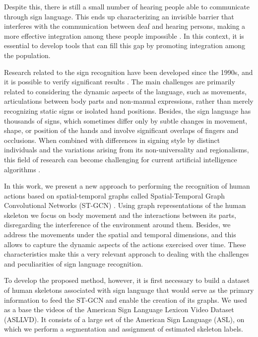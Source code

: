 Despite this, there is still a small number of hearing people able to communicate through sign language. This ends up characterizing an invisible barrier that interferes with the communication between deaf and hearing persons, making a more effective integration among these people impossible \cite{peres-2006}. In this context, it is essential to develop tools that can fill this gap by promoting integration among the population.

Research related to the sign recognition have been developed since the 1990s, and it is possible to verify significant results \cite{lim-2016, recent-advances-dl-2017}. The main challenges are primarily related to considering the dynamic aspects of the language, such as movements, articulations between body parts and non-manual expressions, rather than merely recognizing static signs or isolated hand positions. Besides, the sign language has thousands of signs, which sometimes differ only by subtle changes in movement, shape, or position of the hands and involve significant overlaps of fingers and occlusions. When combined with differences in signing style by distinct individuals and the variations arising from its non-universality and regionalisms, this field of research can become challenging for current artificial intelligence algorithms \cite{konstantinidis-2018}.

In this work, we present a new approach to performing the recognition of human actions based on spatial-temporal graphs called Spatial-Temporal Graph Convolutional Networks (ST-GCN) \cite {st-gcn-2018}. Using graph representations of the human skeleton we focus on body movement and the interactions between its parts, disregarding the interference of the environment around them. Besides, we address the movements under the spatial and temporal dimensions, and this allows to capture the dynamic aspects of the actions exercised over time. These characteristics make this a very relevant approach to dealing with the challenges and peculiarities of sign language recognition.

To develop the proposed method, however, it is first necessary to build a dataset of human skeletons associated with sign language that would serve as the primary information to feed the ST-GCN and enable the creation of its graphs. We used as a base the videos of the American Sign Language Lexicon Video Dataset (ASLLVD). It consists of a large set of the American Sign Language (ASL), on which we perform a segmentation and assignment of estimated skeleton labels. 

